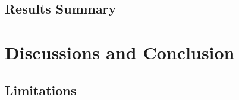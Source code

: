 \documentclass[english]{tktltiki2}
\theoremstyle{definition}
\theoremstyle{remark}
\begin{document}
\subsection{Results Summary}\label{sec:results_summary} %

%


\section{Discussions and Conclusion}\label{sec:conclusion} %
\subsection{Limitations} %
\end{document}
